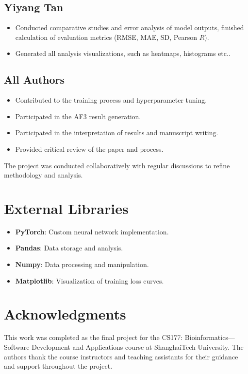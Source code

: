 \documentclass[unnumsec,webpdf,contemporary,large]{oup-authoring-template}
\theoremstyle{thmstyleone}%
\theoremstyle{thmstyletwo}%
\theoremstyle{thmstylethree}%
\begin{document}
\subsection{Yiyang Tan}
\begin{itemize}
    \item Conducted comparative studies and error analysis of model outputs, finished calculation of evaluation metrics (RMSE, MAE, SD, Pearson $R$).
    \item Generated all analysis visualizations, such as heatmaps, histograms etc..
\end{itemize}

\subsection{All Authors}
\begin{itemize}
    \item Contributed to the training process and hyperparameter tuning.
    \item Participated in the AF3 result generation.
    \item Participated in the interpretation of results and manuscript writing.
    \item Provided critical review of the paper and process.
\end{itemize}  

The project was conducted collaboratively with regular 
discussions to refine methodology and analysis.

\section{External Libraries}

\begin{itemize}
    \item \textbf{PyTorch}: Custom neural network implementation.
    \item \textbf{Pandas}: Data storage and analysis.
    \item \textbf{Numpy}: Data processing and manipulation.
    \item \textbf{Matplotlib}: Visualization of training loss curves.
\end{itemize}

\section{Acknowledgments}
This work was completed as the final project for the CS177: Bioinformatics—Software Development 
and Applications course at ShanghaiTech University. 
The authors thank the course instructors and teaching assistants 
for their guidance and support throughout the project.




\end{document}
